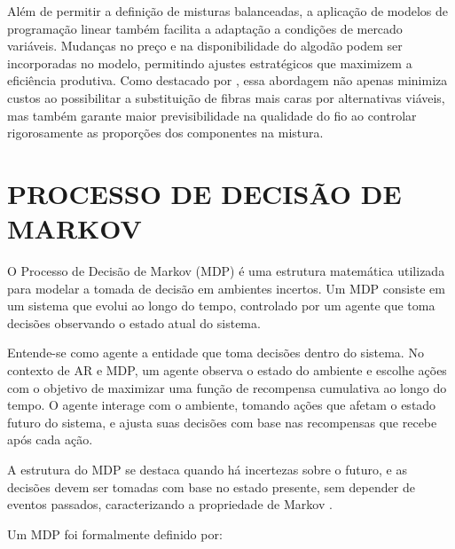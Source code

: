 \documentclass[
    12pt,                %
    openright,           %
    oneside,             %
    a4paper,             %
    english,             %
    spanish,             %
    brazil               %
]{ufscar}
\begin{document}
Além de permitir a definição de misturas balanceadas, a aplicação de modelos de programação linear também facilita a adaptação a condições de mercado variáveis. Mudanças no preço e na disponibilidade do algodão podem ser incorporadas no modelo, permitindo ajustes estratégicos que maximizem a eficiência produtiva. Como destacado por , essa abordagem não apenas minimiza custos ao possibilitar a substituição de fibras mais caras por alternativas viáveis, mas também garante maior previsibilidade na qualidade do fio ao controlar rigorosamente as proporções dos componentes na mistura. 

\section{PROCESSO DE DECISÃO DE MARKOV}

O Processo de Decisão de Markov (MDP) é uma estrutura matemática utilizada para modelar a tomada de decisão em ambientes incertos. Um MDP consiste em um sistema que evolui ao longo do tempo, controlado por um agente que toma decisões observando o estado atual do sistema. 

Entende-se como agente a entidade que toma decisões dentro do sistema. No contexto de AR e MDP, um agente observa o estado do ambiente e escolhe ações com o objetivo de maximizar uma função de recompensa cumulativa ao longo do tempo. O agente interage com o ambiente, tomando ações que afetam o estado futuro do sistema, e ajusta suas decisões com base nas recompensas que recebe após cada ação.

A estrutura do MDP se destaca quando há incertezas sobre o futuro, e as decisões devem ser tomadas com base no estado presente, sem depender de eventos passados, caracterizando a propriedade de Markov \cite{puterman_chapter_1990}.

Um MDP foi formalmente definido por:
\end{document}

